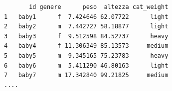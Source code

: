 \documentclass[
  ignorenonframetext,
]{beamer}
\newenvironment{Shaded}{\begin{snugshade}}{\end{snugshade}}
\newcommand{\AttributeTok}[1]{\textcolor[rgb]{0.00,0.34,0.68}{#1}}
\newcommand{\DecValTok}[1]{\textcolor[rgb]{0.69,0.50,0.00}{#1}}
\newcommand{\FunctionTok}[1]{\textcolor[rgb]{0.39,0.29,0.61}{#1}}
\newcommand{\NormalTok}[1]{\textcolor[rgb]{0.12,0.11,0.11}{#1}}
\newcommand{\OtherTok}[1]{\textcolor[rgb]{0.00,0.43,0.16}{#1}}
\newcommand{\SpecialCharTok}[1]{\textcolor[rgb]{0.24,0.68,0.91}{#1}}
\newcommand{\StringTok}[1]{\textcolor[rgb]{0.75,0.01,0.01}{#1}}
\begin{document}
\begin{frame}[fragile]{}
\protect\hypertarget{section-5}{}
\footnotesize

\begin{Shaded}
\end{Shaded}

\begin{verbatim}
       id genere      peso  altezza cat_weight
1   baby1      f  7.424646 62.07722      light
2   baby2      m  7.442727 58.18877      light
3   baby3      f  9.512598 84.52737      heavy
4   baby4      f 11.306349 85.13573     medium
5   baby5      m  9.345165 75.23783      heavy
6   baby6      m  5.411290 46.80163      light
7   baby7      m 17.342840 99.21825     medium
....
\end{verbatim}
\end{frame}
\end{document}
